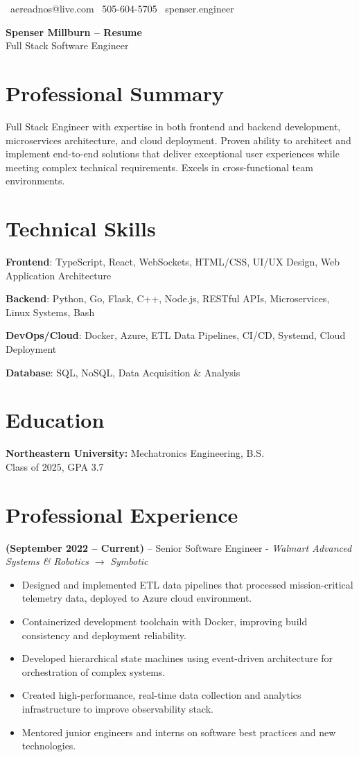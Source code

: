 \documentclass[11pt,a4paper]{article}
\newcommand{\header}[2]{
  \begin{center}
    \huge \textbf{#1}\\
    \large #2
  \end{center}
}
\newcommand{\qualificationarea}[2]{
  \textbf{#1}: #2
}
\newcommand{\jobentry}[2]{
  \vspace{0.5\baselineskip}\textbf{#1} -- #2 
}
\begin{document}
\begin{center}
  \small \faEnvelope\ aereadnos@live.com \hspace{1em} \faPhone\ 505-604-5705 \hspace{1em} \faGlobe\ spenser.engineer
\end{center}

\header{Spenser Millburn -- Resume}{Full Stack Software Engineer}

\section*{Professional Summary}
Full Stack Engineer with expertise in both frontend and backend development, microservices architecture, and cloud deployment. Proven ability to architect and implement end-to-end solutions that deliver exceptional user experiences while meeting complex technical requirements. Excels in cross-functional team environments.

\section*{Technical Skills}
\qualificationarea{Frontend}{TypeScript, React, WebSockets, HTML/CSS, UI/UX Design, Web Application Architecture}

\qualificationarea{Backend}{Python, Go, Flask, C++, Node.js, RESTful APIs, Microservices, Linux Systems, Bash}

\qualificationarea{DevOps/Cloud}{Docker, Azure, ETL Data Pipelines, CI/CD, Systemd, Cloud Deployment}

\qualificationarea{Database}{SQL, NoSQL, Data Acquisition \& Analysis}

\section*{Education}
\textbf{Northeastern University:} Mechatronics Engineering, B.S.\\
Class of 2025, GPA 3.7

\section*{Professional Experience}
\jobentry{(September 2022 -- Current)}{Senior Software Engineer - \textit{Walmart Advanced Systems \& Robotics} $\rightarrow$ \textit{Symbotic}}
\begin{itemize}
\item Designed and implemented ETL data pipelines that processed mission-critical telemetry data, deployed to Azure cloud environment.
\item Containerized development toolchain with Docker, improving build consistency and deployment reliability.
\item Developed hierarchical state machines using event-driven architecture for orchestration of complex systems.
\item Created high-performance, real-time data collection and analytics infrastructure to improve observability stack.
\item Mentored junior engineers and interns on software best practices and new technologies.
\end{itemize}
\end{document}
